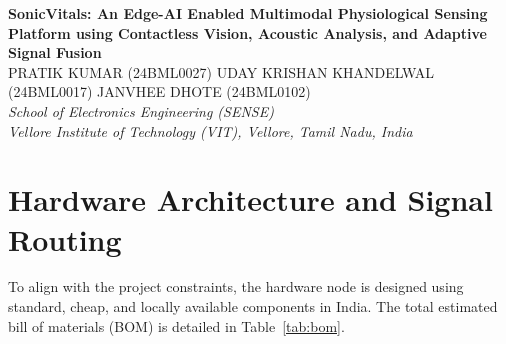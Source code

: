\documentclass[11pt,a4paper]{article}
\begin{document}
\begin{center}
    {\LARGE\bfseries SonicVitals: An Edge-AI Enabled Multimodal Physiological Sensing Platform using Contactless Vision, Acoustic Analysis, and Adaptive Signal Fusion} \\[1.5em]
    
    {\large PRATIK KUMAR (24BML0027) \quad UDAY KRISHAN KHANDELWAL (24BML0017) \quad JANVHEE DHOTE (24BML0102)} \\[1em]
    
    {\itshape School of Electronics Engineering (SENSE) \\ Vellore Institute of Technology (VIT), Vellore, Tamil Nadu, India}
\end{center}

\vspace{1.5em}

\begin{abstract}
\noindent Continuous physiological monitoring is highly desirable in modern clinical and residential environments, yet existing techniques are constrained by contact-based discomfort or susceptibility to environmental noise. Contactless photoplethysmography (rPPG) using video cameras is severely affected by illumination changes and motion artifacts, while acoustic respiratory sensing is vulnerable to ambient sound pollution. This proposal presents the development plan for \textit{SonicVitals}, an edge-assisted, cost-effective multimodal sensing platform designed to address these limitations. Leveraging the Freenove ESP32-S3 WROOM CAM, the platform synchronously acquires high-speed video frames (for facial capillary light absorption tracking) and digital audio signals (via an external INMP441 microphone for thoracic acoustic patterns) on a highly-integrated edge node. These streams are transmitted over Wi-Fi to a host computer where they undergo specialized digital signal processing (DSP) and are fused using a confidence-weighted attention neural network. This plan outlines a rigorous 3-month timeline covering hardware co-design, firmware integration, dual-path DSP development, and validation protocols, with a target budget optimized for the Indian electronics market ($\approx$ INR 1,400).
\end{abstract}

\vspace{1.5em}

\section{Hardware Architecture and Signal Routing}
To align with the project constraints, the hardware node is designed using standard, cheap, and locally available components in India. The total estimated bill of materials (BOM) is detailed in Table~\ref{tab:bom}.
\end{document}
